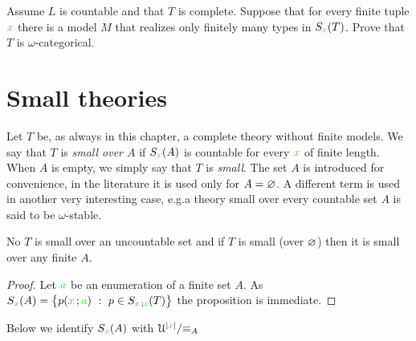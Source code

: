\documentclass[creche.tex]{subfiles}
\begin{document}
\begin{exercise} 
Assume $L$ is countable and that $T$ is complete. Suppose that for every finite tuple  ${\color{brown} x}$ there is a model $M$ that realizes only finitely many types in $S_{\color{brown} x}(T)$. Prove that $T$ is $\omega$-categorical.\QED
\end{exercise}
\section{Small theories}

\def\ceq#1#2#3{\parbox[b]{15ex}{$\displaystyle #1$}\parbox[b]{6ex}{\hfil$#2$}$\displaystyle #3$}


Let $T$ be, as always in this chapter, a complete theory without finite models. We say that $T$ is \emph{small over $A$\/} if $S_{{\color{brown} x}}(A)$ is countable for every ${\color{brown} x}$ of finite length. When $A$ is empty, we simply say that $T$ is \emph{small}. The set $A$ is introduced for convenience, in the literature it is used only for $A=\varnothing$. A different term is used in another very interesting case, e.g.\@ a theory small over every countable set $A$ is said to be $\omega$-stable. 

\begin{proposition}
No $T$ is small over an uncountable set and if $T$ is small (over $\varnothing$) then it is small over any finite $A$.
\end{proposition}

\begin{proof}
Let ${\color{green} a}$ be an enumeration of a finite set $A$. As $S_{\mr x}(A)=\big\{p({\mr x}\,;{\gr a})\ :\ p\in S_{{\mr x}\,;{\gr z}}(T)\big\}$ the proposition is immediate.
\end{proof}

Below we identify $S_{\color{brown} x}(A)$ with $\EuScript U^{|{\color{brown} x}|}/\mathord\equiv_A$
\end{document}
